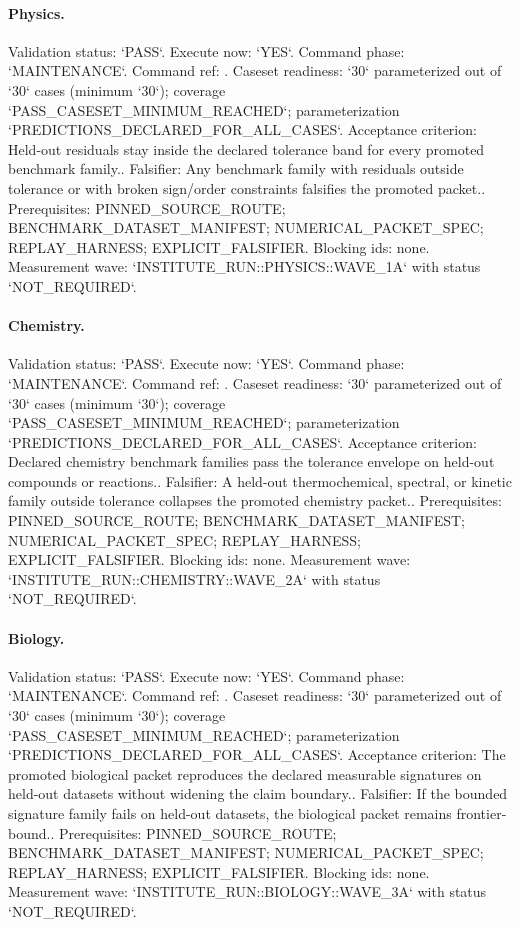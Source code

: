 \paragraph{Physics.}
Validation status: `PASS`. Execute now: `YES`. Command phase: `MAINTENANCE`.
Command ref: .
Caseset readiness: `30` parameterized out of `30` cases (minimum `30`); coverage `PASS\_CASESET\_MINIMUM\_REACHED`; parameterization `PREDICTIONS\_DECLARED\_FOR\_ALL\_CASES`.
Acceptance criterion: Held-out residuals stay inside the declared tolerance band for every promoted benchmark family..
Falsifier: Any benchmark family with residuals outside tolerance or with broken sign/order constraints falsifies the promoted packet..
Prerequisites: PINNED\_SOURCE\_ROUTE; BENCHMARK\_DATASET\_MANIFEST; NUMERICAL\_PACKET\_SPEC; REPLAY\_HARNESS; EXPLICIT\_FALSIFIER.
Blocking ids: none.
Measurement wave: `INSTITUTE\_RUN::PHYSICS::WAVE\_1A` with status `NOT\_REQUIRED`.

\paragraph{Chemistry.}
Validation status: `PASS`. Execute now: `YES`. Command phase: `MAINTENANCE`.
Command ref: .
Caseset readiness: `30` parameterized out of `30` cases (minimum `30`); coverage `PASS\_CASESET\_MINIMUM\_REACHED`; parameterization `PREDICTIONS\_DECLARED\_FOR\_ALL\_CASES`.
Acceptance criterion: Declared chemistry benchmark families pass the tolerance envelope on held-out compounds or reactions..
Falsifier: A held-out thermochemical, spectral, or kinetic family outside tolerance collapses the promoted chemistry packet..
Prerequisites: PINNED\_SOURCE\_ROUTE; BENCHMARK\_DATASET\_MANIFEST; NUMERICAL\_PACKET\_SPEC; REPLAY\_HARNESS; EXPLICIT\_FALSIFIER.
Blocking ids: none.
Measurement wave: `INSTITUTE\_RUN::CHEMISTRY::WAVE\_2A` with status `NOT\_REQUIRED`.

\paragraph{Biology.}
Validation status: `PASS`. Execute now: `YES`. Command phase: `MAINTENANCE`.
Command ref: .
Caseset readiness: `30` parameterized out of `30` cases (minimum `30`); coverage `PASS\_CASESET\_MINIMUM\_REACHED`; parameterization `PREDICTIONS\_DECLARED\_FOR\_ALL\_CASES`.
Acceptance criterion: The promoted biological packet reproduces the declared measurable signatures on held-out datasets without widening the claim boundary..
Falsifier: If the bounded signature family fails on held-out datasets, the biological packet remains frontier-bound..
Prerequisites: PINNED\_SOURCE\_ROUTE; BENCHMARK\_DATASET\_MANIFEST; NUMERICAL\_PACKET\_SPEC; REPLAY\_HARNESS; EXPLICIT\_FALSIFIER.
Blocking ids: none.
Measurement wave: `INSTITUTE\_RUN::BIOLOGY::WAVE\_3A` with status `NOT\_REQUIRED`.

